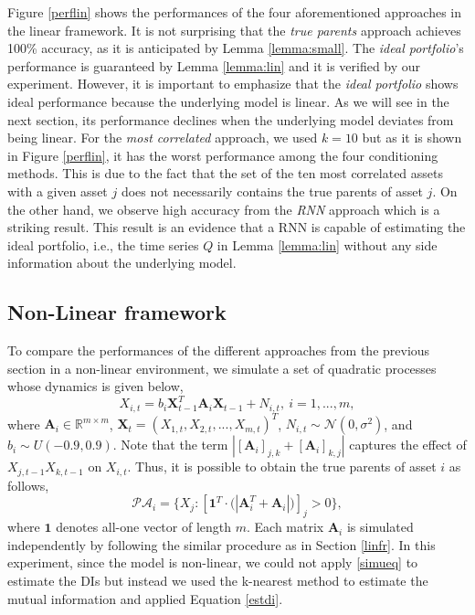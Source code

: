 Figure \ref{perflin} shows the performances of the four aforementioned approaches in the linear framework. 
It is not surprising that the \textit{true parents} approach achieves 100\% accuracy, as it is anticipated by Lemma \ref{lemma:small}.
The \textit{ideal portfolio}'s performance is guaranteed by Lemma \ref{lemma:lin} and it is verified by our experiment.
However, it is important to emphasize that the \textit{ideal portfolio} shows ideal performance because the underlying model is linear. 
As we will see in the next section, its performance declines when the underlying model deviates from being linear. 
For the \textit{most correlated} approach, we used $k=10$ but as it is shown in Figure \ref{perflin}, it has the worst performance among the four conditioning methods. 
This is due to the fact that the set of the ten most correlated assets with a given asset $j$ does not necessarily contains the true parents of asset $j$.
On the other hand, we observe high accuracy from the \textit{RNN} approach which is a striking result.
This result is an evidence that a RNN is capable of estimating the ideal portfolio, i.e., the time series $Q$ in Lemma \ref{lemma:lin} without any side information about the underlying model. 





\subsection{Non-Linear framework} \label{nonlinfr}
To compare the performances of the different approaches from the previous section in a non-linear environment, we simulate a set of quadratic processes whose dynamics is given below, 
\begin{equation}\label{eq:ex_non}
        X_{i,t} =b_i  {\textbf{X}^T_{t-1}} \textbf{A}_i \textbf{X}_{t-1} + N_{i,t}, \ i=1,...,m,
\end{equation}
where $\textbf{A}_i\in\mathbb{R}^{m \times m}$, $\textbf{X}_t = (X_{1,t}, X_{2,t},..., X_{m,t})^T$, $N_{i,t}\sim\mathcal{N}(0,\sigma^2)$, and $b_i\sim U(-0.9 , 0.9)$.
Note that the term $|[\textbf{A}_i]_{j,k} + [\textbf{A}_i]_{k,j}|$ captures the effect of $X_{j,t-1}X_{k,t-1}$ on $X_{i,t}$. Thus, it is possible to obtain the true parents of asset $i$ as follows,
\begin{equation}
 \mathcal{PA}_i = \{ X_j :  [\textbf{1}^T \cdot \big(|\textbf{A}^T_i + \textbf{A}_i|\big)]_{j}  > 0\},
\end{equation}
where $\textbf{1}$ denotes all-one vector of length $m$.
Each matrix $\textbf{A}_i$ is simulated independently by following the similar procedure as in Section \ref{linfr}.
In this experiment, since the model is non-linear, we could not apply \eqref{simueq} to estimate the DIs but instead we used the k-nearest method to estimate the mutual information and applied Equation \eqref{estdi}.


